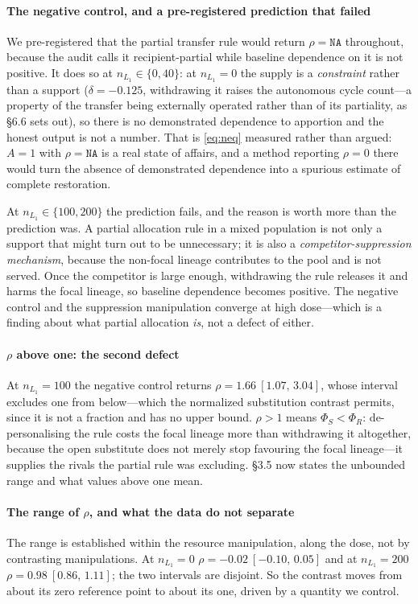 \documentclass[review,3p,times]{elsarticle}
\begin{document}
\paragraph{The negative control, and a pre-registered prediction that
failed} We pre-registered that the partial transfer rule would return
$\rho=\texttt{NA}$ throughout, because the audit calls it
recipient-partial while baseline dependence on it is not positive. It
does so at $n_{L_1}\in\{0, 40\}$: at
$n_{L_1}=0$ the supply is a \emph{constraint} rather than a support
($\delta=-0.125$, withdrawing it raises
the autonomous cycle count---a property of the transfer being
externally operated rather than of its partiality, as \S6.6 sets out),
so there is no demonstrated dependence to
apportion and the honest output is not a number. That is \eqref{eq:neq}
measured rather than argued: $A=1$ with $\rho=\texttt{NA}$ is a real
state of affairs, and a method reporting $\rho=0$ there would turn the
absence of demonstrated dependence into a spurious estimate of
complete restoration.

At $n_{L_1}\in\{100, 200\}$ the
prediction fails, and the reason is worth more than the prediction
was. A partial allocation rule in a mixed population is not only a
support that might turn out to be unnecessary; it is also a
\emph{competitor-suppression mechanism}, because the non-focal
lineage contributes to the pool and is not served. Once the
competitor is large enough, withdrawing the rule releases it and
harms the focal lineage, so baseline dependence becomes positive.
The negative control and the suppression manipulation converge at
high dose---which is a finding about what partial allocation
\emph{is}, not a defect of either.

\paragraph{\texorpdfstring{$\rho$}{rho} above one: the second defect}
At $n_{L_1}=100$ the negative control returns
$\rho=1.66~[1.07,\,3.04]$, whose interval excludes one from
below---which the normalized substitution contrast permits, since
it is not a fraction and has no upper bound. $\rho>1$ means
$\Phi_S<\Phi_R$: de-personalising the rule costs the focal lineage more
than withdrawing it altogether, because the open substitute does not
merely stop favouring the focal lineage---it supplies the rivals the
partial rule was excluding. \S3.5 now states the unbounded range and
what values above one mean.

\paragraph{The range of \texorpdfstring{$\rho$}{rho}, and what the data do not separate}
The range is established within the resource manipulation, along the
dose, not by contrasting manipulations. At $n_{L_1}=0$
$\rho=-0.02~[-0.10,\,0.05]$ and at $n_{L_1}=200$
$\rho=0.98~[0.86,\,1.11]$; the two intervals are disjoint.
So the contrast moves from about its zero reference point to about its
one, driven by a quantity we control.
\end{document}
